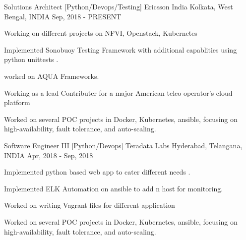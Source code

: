 

\begin{cventries}

    \cventry
    {Solutions Architect [Python/Devops/Testing]} %
    {Ericsson India} %
    {Kolkata, West Bengal, INDIA} %
    {Sep, 2018 - PRESENT} %
    {
      \begin{cvitems} %
        \item {Working on different projects on NFVI, Openstack, Kubernetes}
        \item {Implemented Sonobuoy Testing Framework with additional capablities using python unittests .}
        \item {worked on AQUA Frameworks.}
        \item {Working as a lead Contributer for a major American telco operator's cloud platform }
        \item {Worked on several POC projects in Docker, Kubernetes, ansible, focusing on high-availability, fault tolerance, and auto-scaling. }
      \end{cvitems}
    }

  \cventry
    {Software Engineer III [Python/Devops]} %
    {Teradata Labs} %
    {Hyderabad, Telangana, INDIA} %
    {Apr, 2018 - Sep, 2018} %
    {
      \begin{cvitems} %
        \item {Implemented python based web app to cater different needs .}
        \item {Implemented ELK Automation on ansible to add n host for monitoring. }
        \item {Worked on writing Vagrant files for different application }
        \item {Worked on several POC projects in Docker, Kubernetes, ansible, focusing on high-availability, fault tolerance, and auto-scaling. }
      \end{cvitems}
    }


\end{cventries}
